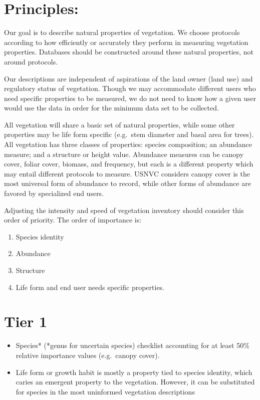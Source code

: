 \documentclass[
]{book}
\begin{document}
\hypertarget{principles}{%
\section*{Principles:}\label{principles}}

Our goal is to describe natural properties of vegetation. We choose protocols according to how efficiently or accurately they perform in measuring vegetation properties. Databases should be constructed around these natural properties, not around protocols.

Our descriptions are independent of aspirations of the land owner (land use) and regulatory status of vegetation. Though we may accommodate different users who need specific properties to be measured, we do not need to know how a given user would use the data in order for the minimum data set to be collected.

All vegetation will share a basic set of natural properties, while some other properties may be life form specific (e.g.~stem diameter and basal area for trees). All vegetation has three classes of properties: species composition; an abundance measure; and a structure or height value. Abundance measures can be canopy cover, foliar cover, biomass, and frequency, but each is a different property which may entail different protocols to measure. USNVC considers canopy cover is the most universal form of abundance to record, while other forms of abundance are favored by specialized end users.

Adjusting the intensity and speed of vegetation inventory should consider this order of priority. The order of importance is:

\begin{enumerate}
\def\labelenumi{\arabic{enumi}.}
\item
  Species identity
\item
  Abundance
\item
  Structure
\item
  Life form and end user needs specific properties.
\end{enumerate}

\hypertarget{tier-1}{%
\section{Tier 1}\label{tier-1}}

\begin{itemize}
\item
  Species* (*genus for uncertain species) checklist accounting for at least 50\% relative importance values (e.g.~canopy cover).
\item
  Life form or growth habit is mostly a property tied to species identity, which caries an emergent property to the vegetation. However, it can be substituted for species in the most uninformed vegetation descriptions
\end{itemize}
\end{document}
